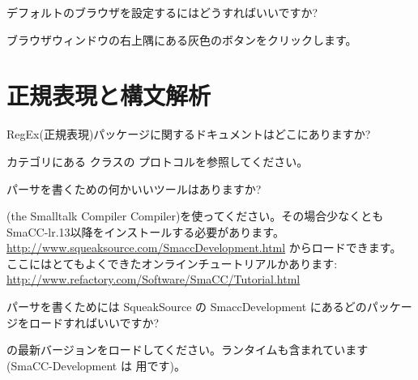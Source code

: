 \documentclass[a4paper,10pt,twoside]{book}
\begin{document}
\begin{faq}
デフォルトのブラウザを設定するにはどうすればいいですか?
\end{faq}
\answer
ブラウザウィンドウの右上隅にある灰色のボタンをクリックします。

\section{正規表現と構文解析}


\begin{faq}
RegEx(正規表現)パッケージに関するドキュメントはどこにありますか?
\end{faq}
\answer
{} カテゴリにある  クラスの  プロトコルを参照してください。

\begin{faq}
パーサを書くための何かいいツールはありますか?
\end{faq}
\answer
{}(the Smalltalk Compiler Compiler)を使ってください。その場合少なくともSmaCC-lr.13以降をインストールする必要があります。
\url{http://www.squeaksource.com/SmaccDevelopment.html} からロードできます。
ここにはとてもよくできたオンラインチュートリアルかあります:
\url{http://www.refactory.com/Software/SmaCC/Tutorial.html}

\begin{faq}
パーサを書くためには SqueakSource の SmaccDevelopment にあるどのパッケージをロードすればいいですか?
\end{faq}
\answer
{} の最新バージョンをロードしてください。ランタイムも含まれています
(SmaCC-Development は  用です)。

\ifx\wholebook\relax\else
\end{document}
